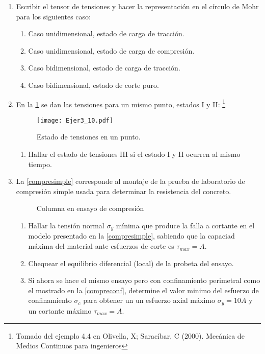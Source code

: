 \documentclass[../notas medios.tex]{subfiles}
\begin{document}
\begin{enumerate}
\item \label{punto08} Escribir el tensor de tensiones y hacer la
representaci\'on en el c\'irculo de Mohr para los siguientes caso:
%
\begin{enumerate}
	\item Caso unidimensional, estado de carga de tracci\'on.
	\item Caso unidimensional, estado de carga de compresi\'on.
	\item Caso bidimensional, estado de carga de tracci\'on.
	\item Caso bidimensional, estado de corte puro.
\end{enumerate}

\item \label{punto10} En la \cref{super:cuna-square} se dan las tensiones
para un mismo punto, estados I y II:  \footnote{Tomado del ejemplo 4.4 en Olivella, X; Saracíbar, C (2000). Mecánica de Medios Continuos para ingenieros}\\
%
\begin{figure}[H]
	\centering
	\texttt{[image: Ejer3\_10.pdf]}
	\caption{Estado de tensiones en un punto.}
	\label{super:cuna-square}
\end{figure}
%
\begin{enumerate}
	\item Hallar el estado de tensiones III si el estado I y II ocurren al mismo tiempo.
\end{enumerate}
\item \label{punto11} La \cref{compresimple} corresponde al montaje
de la prueba de laboratorio de compresi\'on simple usada para determinar la resistencia del concreto.\\
%
\begin{figure}[H]	
	\centering	
	\hspace{10mm}
	\caption{Columna en ensayo de compresión}
\end{figure}
%
\begin{enumerate}
	\item Hallar la tensión normal $\sigma_y$ m\'inima que produce la falla a cortante en el modelo presentado en la \cref{compresimple}, sabiendo que la capaciad m\'axima del material ante esfuerzos de corte es $\tau_{max}=A$.
	\item Chequear el equilibrio diferencial (local) de la probeta del ensayo.
	\item Si ahora se hace el mismo ensayo pero con confinamiento perimetral como el mostrado en la \cref{compreconf}, determine el valor minimo del esfuerzo de confinamiento $\sigma_c$ para obtener un un  esfuerzo axial máximo $\sigma_y = 10A$ y un cortante máximo  $\tau_{max}=A$.
\end{enumerate}


\end{enumerate}
\end{document}
